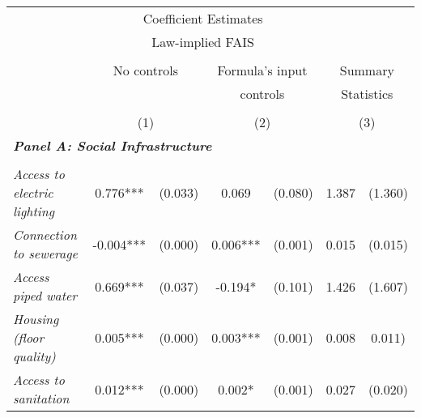 

\begin{tabular}{lcccccc}

\toprule

\multicolumn{1}{l}{} & \multicolumn{4}{c}{Coefficient Estimates} & \multicolumn{2}{c}{} \\
\multicolumn{1}{l}{} & \multicolumn{4}{c}{Law-implied FAIS} & \multicolumn{2}{c}{ } \\

\cmidrule(l{1mm}r{1mm}){2-5}   \\


\multicolumn{1}{l}{} & \multicolumn{2}{c}{No controls} & \multicolumn{2}{c}{Formula's input } & \multicolumn{2}{c}{Summary} \\
\multicolumn{1}{l}{} & \multicolumn{2}{c}{} & \multicolumn{2}{c}{controls} & \multicolumn{2}{c}{Statistics} \\


\cmidrule(l{1mm}r{1mm}){2-3} \cmidrule(l{1mm}r{1mm}){4-5} \cmidrule(l{1mm}r{1mm}){6-7}  \\

\multicolumn{1}{l}{} & \multicolumn{2}{c}{(1)} & \multicolumn{2}{c}{(2)} & \multicolumn{2}{c}{(3)}  \\ 
 
\midrule

\multicolumn{7}{l}{\textit{\bf Panel  A: Social Infrastructure}}   \\  
\\
\textit{Access to electric lighting}  &  0.776***  
					   & (0.033) 
					   &  0.069  
					   & (0.080) 
					   &  1.387  
					   &  (1.360) \\ [0.2cm]
					   
\textit{Connection to sewerage}  &  -0.004***  
					   & (0.000) 
					   &  0.006***  
					   & (0.001)
					   &  0.015  
					   &  (0.015) \\[0.2cm]
					   
\textit{Access piped water}  &  0.669***  
					   & (0.037) 
					   &  -0.194*  
					   & (0.101)
					   &  1.426  
					   &  (1.607) \\[0.2cm]
					   
\textit{Housing (floor quality)}  &  0.005***  
					   & (0.000) 
					   &  0.003***  
					   & (0.001)
					   &  0.008  
					   &  0.011) \\[0.2cm]
					   
\textit{Access to sanitation}  &  0.012***  
					   & (0.000) 
					   &  0.002*  
					   & (0.001) 
					   &  0.027  
					   &  (0.020) \\[0.2cm]


\end{tabular}

